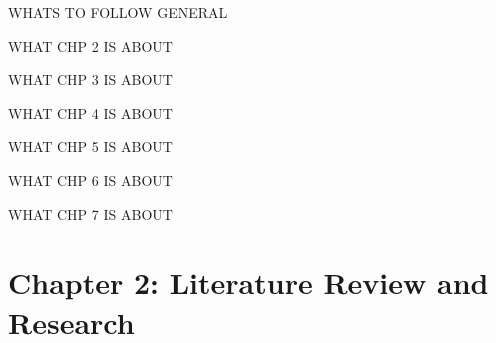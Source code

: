 \documentclass[a4paper,12pt]{article}
\begin{document}
\par WHATS TO FOLLOW GENERAL

\par WHAT CHP 2 IS ABOUT
\par WHAT CHP 3 IS ABOUT
\par WHAT CHP 4 IS ABOUT
\par WHAT CHP 5 IS ABOUT
\par WHAT CHP 6 IS ABOUT
\par WHAT CHP 7 IS ABOUT





\newpage
\section{Chapter 2: Literature Review and Research}
\end{document}
